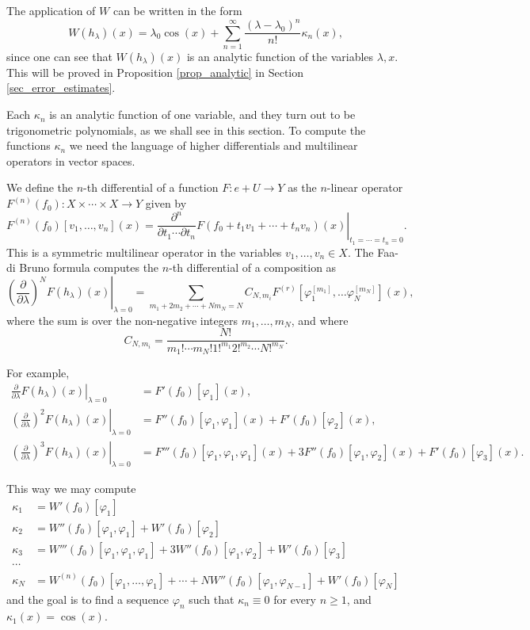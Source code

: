 \documentclass{amsart}
\def \R{\mathbb R}
\begin{document}
The application of $W$ can be written in the form
\[W(h_\lambda)(x) = \lambda_0 \cos(x) + \sum_{n=1}^\infty \frac {(\lambda-\lambda_0)^n}{n!} \kappa_n(x),\]
since one can see that $W(h_\lambda)(x)$ is an analytic function of the variables $\lambda, x$.
This will be proved in Proposition \ref{prop_analytic} in Section \ref{sec_error_estimates}.

Each $\kappa_n$ is an analytic function of one variable, and they turn out to be trigonometric polynomials, as we shall see in this section.
To compute the functions $\kappa_n$ we need the language of higher differentials and multilinear operators in vector spaces.

We define the $n$-th differential of a function $F: e+U \to Y$ as the $n$-linear operator $F^{(n)}(f_0): X \times \cdots \times X \to Y$ given by
\[
	F^{(n)}(f_0)[v_1, \ldots, v_n](x) = \left. \frac{\partial^n}{\partial t_1 \cdots \partial t_n} F(f_0 + t_1 v_1 + \cdots + t_n v_n)(x) \right|_{t_1 = \cdots = t_n=0}.
\]
This is a symmetric multilinear operator in the variables $v_1, \ldots, v_n \in X$.
The Faa-di Bruno formula computes the $n$-th differential of a composition as
\begin{equation}
	\label{eq_faadibruno}
	\left. \left( \frac\partial{\partial \lambda}\right)^N F(h_\lambda)(x) \right|_{\lambda=0} = 
		\sum_{m_1 + 2 m_2 + \cdots + N m_N = N} C_{N, m_i} F^{(r)}[\varphi_1^{[m_1]}, \ldots \varphi_N^{[m_N]}](x),
\end{equation}
where the sum is over the non-negative integers $m_1, \ldots, m_N$, and where
\[C_{N, m_i} = \frac {N!}{m_1! \cdots m_N! 1!^{m_1} 2!^{m_2} \cdots N!^{m_N}}.\]

For example,
\begin{align}
	\left. \frac\partial{\partial \lambda} F(h_\lambda)(x) \right|_{\lambda=0} &= F'(f_0)[\varphi_1](x), \\
		\left. \left(\frac\partial{\partial \lambda}\right)^2 F(h_\lambda)(x) \right|_{\lambda=0} &= F''(f_0)[\varphi_1, \varphi_1](x) + F'(f_0)[\varphi_2](x), \\
			\left. \left(\frac\partial{\partial \lambda}\right)^3 F(h_\lambda)(x) \right|_{\lambda=0} &= F'''(f_0)[\varphi_1, \varphi_1, \varphi_1](x) + 3F''(f_0)[\varphi_1, \varphi_2](x) + F'(f_0)[\varphi_3](x).
\end{align}

This way we may compute 
\begin{align}
	\kappa_1 &= W'(f_0)[\varphi_1] \label{eq_faa_1} \\
	\kappa_2 &= W''(f_0)[\varphi_1, \varphi_1] + W'(f_0)[\varphi_2] \label{eq_faa_2} \\
	\kappa_3 &= W'''(f_0)[\varphi_1, \varphi_1, \varphi_1] + 3W''(f_0)[\varphi_1, \varphi_2] + W'(f_0)[\varphi_3] \\
	\cdots \\
	\kappa_N &= W^{(n)}(f_0)[\varphi_1, \ldots, \varphi_1] + \cdots + N W''(f_0)[\varphi_1, \varphi_{N-1}] + W'(f_0)[\varphi_N]
\end{align}
and the goal is to find a sequence $\varphi_n$ such that $\kappa_n \equiv 0$ for every $n \geq 1$, and $\kappa_1(x) = \cos(x)$.
\end{document}
